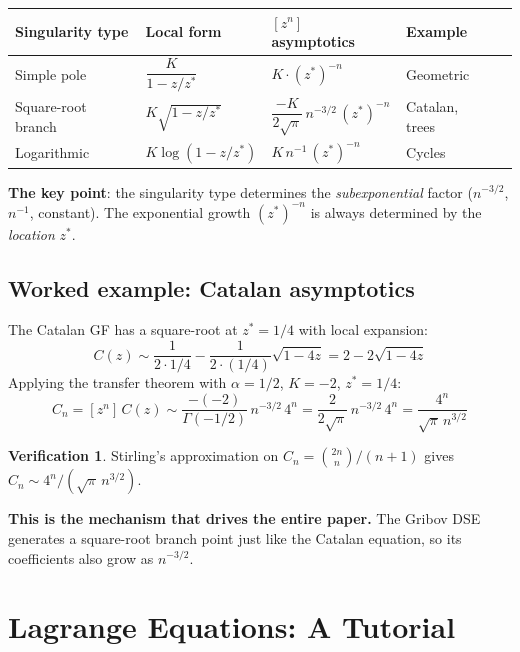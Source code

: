 \documentclass[11pt,a4paper]{article}
\theoremstyle{definition}
\newtheorem*{verification}{Verification}
\begin{document}
\begin{center}
\renewcommand{\arraystretch}{1.4}
\begin{tabular}{lllll}
\toprule
\textbf{Singularity type} & \textbf{Local form} & $[z^n]$ \textbf{asymptotics} & \textbf{Example} \\
\midrule
Simple pole & $\dfrac{K}{1 - z/z^*}$ & $K \cdot (z^*)^{-n}$ & Geometric \\[8pt]
Square-root branch & $K\sqrt{1 - z/z^*}$ & $\dfrac{-K}{2\sqrt{\pi}}\, n^{-3/2}\, (z^*)^{-n}$ & Catalan, trees \\[8pt]
Logarithmic & $K\log(1 - z/z^*)$ & $K\, n^{-1}\, (z^*)^{-n}$ & Cycles \\
\bottomrule
\end{tabular}
\end{center}

\textbf{The key point}: the singularity type determines the
\emph{subexponential} factor ($n^{-3/2}$, $n^{-1}$, constant).
The exponential growth $(z^*)^{-n}$ is always determined by the
\emph{location} $z^*$.

\subsection{Worked example: Catalan asymptotics}

The Catalan GF has a square-root at $z^* = 1/4$ with local expansion:
\[
C(z) \sim \frac{1}{2 \cdot 1/4} - \frac{1}{2 \cdot (1/4)}\sqrt{1 - 4z}
= 2 - 2\sqrt{1 - 4z}
\]
Applying the transfer theorem with $\alpha = 1/2$, $K = -2$, $z^* = 1/4$:
\[
C_n = [z^n]\,C(z) \sim \frac{-(-2)}{\Gamma(-1/2)}\, n^{-3/2}\, 4^n
= \frac{2}{2\sqrt{\pi}}\, n^{-3/2}\, 4^n = \frac{4^n}{\sqrt{\pi}\, n^{3/2}}
\]

\begin{verification}
Stirling's approximation on $C_n = \binom{2n}{n}/(n+1)$ gives
$C_n \sim 4^n / (\sqrt{\pi}\, n^{3/2})$. \checkmark
\end{verification}

\textbf{This is the mechanism that drives the entire paper.}
The Gribov DSE generates a square-root branch point just like the Catalan
equation, so its coefficients also grow as $n^{-3/2}$.

\section{Lagrange Equations: A Tutorial}
\label{app:lagrange_tutorial}
\end{document}

